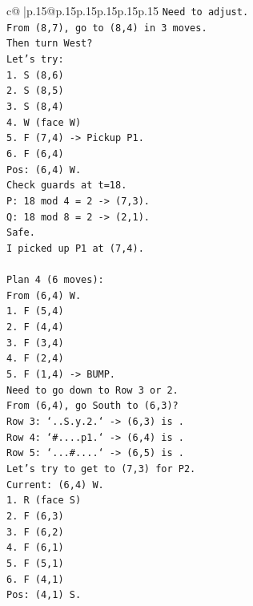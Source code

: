 \documentclass{article}
\begin{document}
{\begin{supertabular}{c@{$\;$}|p{.15\linewidth}@{}p{.15\linewidth}p{.15\linewidth}p{.15\linewidth}p{.15\linewidth}p{.15\linewidth}}
{{{\texttt{Need to adjust.} \\
\texttt{From (8,7), go to (8,4) in 3 moves.} \\
\texttt{Then turn West?} \\
\texttt{Let's try:} \\
\texttt{1. S (8,6)} \\
\texttt{2. S (8,5)} \\
\texttt{3. S (8,4)} \\
\texttt{4. W (face W)} \\
\texttt{5. F (7,4) {-}> Pickup P1.} \\
\texttt{6. F (6,4)} \\
\texttt{Pos: (6,4) W.} \\
\texttt{Check guards at t=18.} \\
\texttt{P: 18 mod 4 = 2 {-}> (7,3).} \\
\texttt{Q: 18 mod 8 = 2 {-}> (2,1).} \\
\texttt{Safe.} \\
\texttt{I picked up P1 at (7,4).} \\
\\ 
\texttt{Plan 4 (6 moves):} \\
\texttt{From (6,4) W.} \\
\texttt{1. F (5,4)} \\
\texttt{2. F (4,4)} \\
\texttt{3. F (3,4)} \\
\texttt{4. F (2,4)} \\
\texttt{5. F (1,4) {-}> BUMP.} \\
\texttt{Need to go down to Row 3 or 2.} \\
\texttt{From (6,4), go South to (6,3)?} \\
\texttt{Row 3: `..S.y.2.` {-}> (6,3) is .} \\
\texttt{Row 4: `\#....p1.` {-}> (6,4) is .} \\
\texttt{Row 5: `...\#....` {-}> (6,5) is .} \\
\texttt{Let's try to get to (7,3) for P2.} \\
\texttt{Current: (6,4) W.} \\
\texttt{1. R (face S)} \\
\texttt{2. F (6,3)} \\
\texttt{3. F (6,2)} \\
\texttt{4. F (6,1)} \\
\texttt{5. F (5,1)} \\
\texttt{6. F (4,1)} \\
\texttt{Pos: (4,1) S.} \\
}}}
\end{supertabular}}
\end{document}
